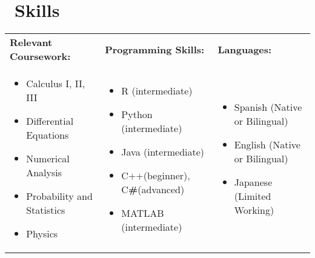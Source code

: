 \documentclass{resume}
\begin{document}
\section{\faCogs\ Skills}
\begin{tabularx}{\textwidth}{X X X}
    \small \textbf{Relevant Coursework:}  & \small \textbf{Programming Skills:}  & \small \textbf {Languages:}\\
    \vspace{-0.5em}\begin{itemize}[parsep=0.5ex]
       \item Calculus I, II, III
        \item Differential Equations
        \item Numerical Analysis
        \item Probability and Statistics  
        \item Physics
    \end{itemize} &
    \vspace{-0.5em}\begin{itemize}[parsep=0.5ex]
        \item R (intermediate)
        \item Python (intermediate) 
        \item Java (intermediate)
        \item C++(beginner), C{\scriptsize\bf \#}(advanced)
        \item MATLAB (intermediate)
    \end{itemize} &
     \vspace{-0.5em}\begin{itemize}[parsep=0.5ex]
        \item Spanish (Native or Bilingual)
        \item English (Native or Bilingual)
        \item Japanese (Limited Working)
    \end{itemize}\\
\end{tabularx}
\end{document}
